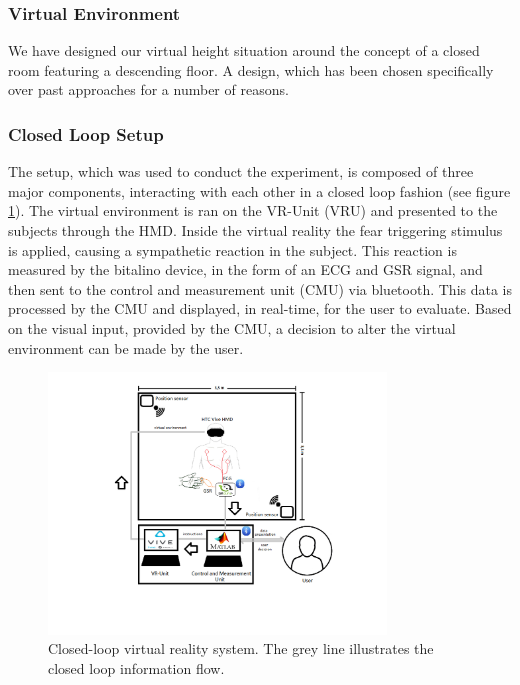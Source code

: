 \subsubsection{Virtual Environment}
We have designed our virtual height situation around the concept of a closed room featuring a descending floor. A design, which has been chosen specifically over past approaches for a number of reasons. 
 

\subsubsection{Closed Loop Setup}
The setup, which was used to conduct the experiment, is composed of three major components, interacting with each other in a closed loop fashion (see figure \ref{setupImg}). The virtual environment is ran on the VR-Unit (VRU) and presented to the subjects through the HMD. Inside the virtual reality the fear triggering stimulus is applied, causing a sympathetic reaction in the subject. This reaction is measured by the bitalino device, in the form of an ECG and GSR signal, and then sent to the control and measurement unit (CMU) via bluetooth. This data is processed by the CMU and displayed, in real-time, for the user to evaluate. Based on the visual input, provided by the CMU, a decision to alter the virtual environment can be made by the user.  




\begin{figure}[ht]
\centering
\includegraphics[width=0.8\textwidth]{images/setup.png}
\caption{Closed-loop virtual reality system. The grey line illustrates the closed loop information flow.}
\label{setupImg}
\end{figure}


